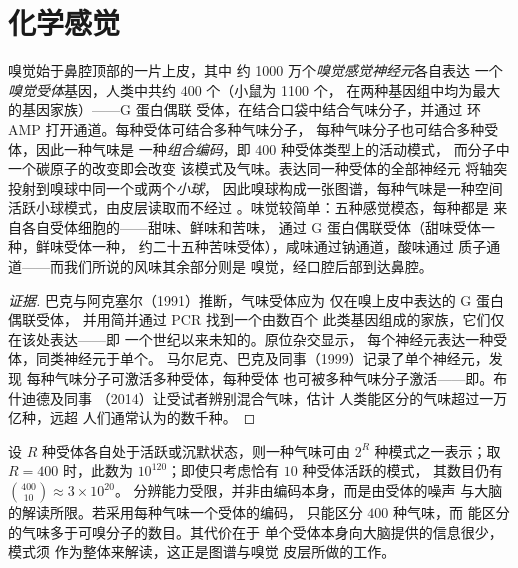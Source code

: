 \section{化学感觉}

\begin{definition}[嗅觉与味觉]\label{def:b3:sensory-systems:chemical}
嗅觉始于鼻腔顶部的一片上皮，其中
约 1000 万个\emph{嗅觉感觉神经元}各自表达
一个\emph{嗅觉受体}基因，人类中共约 $400$ 个（小鼠为 \num{1100} 个，
在两种基因组中均为最大的基因家族）——G 蛋白偶联
受体，在结合口袋中结合气味分子，并通过
环 AMP 打开通道。每种受体可结合多种气味分子，
每种气味分子也可结合多种受体，因此一种气味是
一种\emph{组合编码}，即 $400$ 种受体类型上的活动模式，
而分子中一个碳原子的改变即会改变
该模式及气味。表达同一种受体的全部神经元
将轴突投射到嗅球中同一个或两个\emph{小球}，
因此嗅球构成一张图谱，每种气味是一种空间
活跃小球模式，由皮层读取而不经过
。味觉较简单：五种感觉模态，每种都是
来自各自受体细胞的——甜味、鲜味和苦味，
通过 G 蛋白偶联受体（甜味受体一种，鲜味受体一种，
约二十五种苦味受体），咸味通过钠通道，酸味通过
质子通道——而我们所说的风味其余部分则是
嗅觉，经口腔后部到达鼻腔。
\end{definition}

\begin{proof}[证据]
巴克与阿克塞尔（1991）推断，气味受体应为
仅在嗅上皮中表达的 G 蛋白偶联受体，
并用简并通过 PCR 找到一个由数百个
此类基因组成的家族，它们仅在该处表达——即
一个世纪以来未知的。原位杂交显示，
每个神经元表达一种受体，同类神经元于单个。
马尔尼克、巴克及同事（1999）记录了单个神经元，发现
每种气味分子可激活多种受体，每种受体
也可被多种气味分子激活——即。布什迪德及同事
（2014）让受试者辨别混合气味，估计
人类能区分的气味超过一万亿种，远超
人们通常认为的数千种。
\end{proof}

\begin{proposition}[组合编码的容量]\label{prop:b3:sensory-systems:combinatorial}
设 $R$ 种受体各自处于活跃或沉默状态，则一种气味可由
$2^{R}$ 种模式之一表示；取 $R = 400$ 时，此数为
$10^{120}$；即使只考虑恰有 $10$ 种受体活跃的模式，
其数目仍有 $\binom{400}{10} \approx 3\times 10^{20}$。
分辨能力受限，并非由编码本身，而是由受体的噪声
与大脑的解读所限。若采用每种气味一个受体的编码，
只能区分 $400$ 种气味，而
能区分的气味多于可嗅分子的数目。其代价在于
单个受体本身向大脑提供的信息很少，模式须
作为整体来解读，这正是图谱与嗅觉
皮层所做的工作。
\end{proposition}

